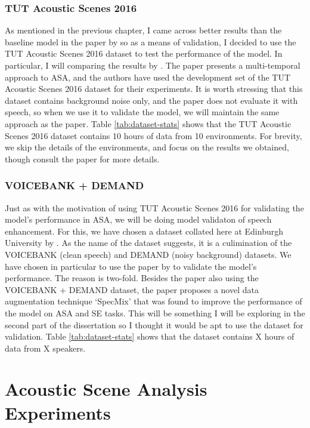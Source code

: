 \documentclass[logo,bsc,singlespacing,parskip,online]{infthesis}
\begin{document}
\subsection{TUT Acoustic Scenes 2016}
As mentioned in the previous chapter, I came across better results than the baseline model in the paper by \citet{Huwel2020HearDS} 
so as a means of validation, I decided to use the TUT Acoustic Scenes 2016 dataset \citep{mesaros_tut_2016} to test the performance of the model.
In particular, I will comparing the results by \citet{schindler_multi-temporal_2018}. The paper presents a multi-temporal approach to ASA, and 
the authors have used the development set of the TUT Acoustic Scenes 2016 dataset for their experiments. It is worth stressing 
that this dataset contains background noise only, and the paper does not evaluate it with speech, so when we use it to validate 
the model, we will maintain the same approach as the paper.
Table \ref{tab:dataset-stats} shows that the TUT Acoustic Scenes 2016 dataset contains 10 hours of data from 10 environments.
For brevity, we skip the details of the environments, and focus on the results we obtained, though consult the paper for more details.

\subsection{VOICEBANK + DEMAND}
Just as with the motivation of using TUT Acoustic Scenes 2016 for validating the model's performance in ASA,
we will be doing model validaton of speech enhancement. 
For this, we have chosen a dataset collated here at Edinburgh University by \citet{valentini-botinhao_speech_2016}. 
As the name of the dataset suggests, it is a culimination of the VOICEBANK \cite{TODO} (clean speech) and DEMAND \cite{TODO} (noisy background) datasets.
We have chosen in particular to use the paper by \citet{kim_specmix_2021} to validate the model's performance.
The reason is two-fold. Besides the paper also using the VOICEBANK + DEMAND dataset, the paper proposes a novel data augmentation technique
`SpecMix' that was found to improve the performance of the model on ASA and SE tasks. This will be something I will be exploring in the 
second part of the dissertation so I thought it would be apt to use the dataset for validation.
Table \ref{tab:dataset-stats} shows that the dataset contains X hours of data from X speakers.

\chapter{Acoustic Scene Analysis Experiments}
\label{chap:acoustic-scene-classification}
\end{document}
